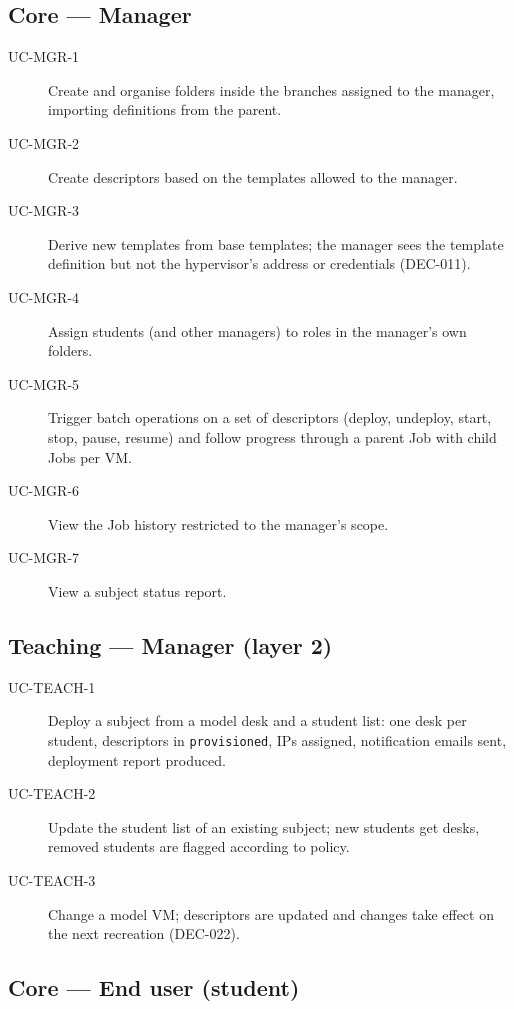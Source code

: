 \subsection{Core --- Manager}

\begin{description}
  \item[UC-MGR-1] Create and organise folders inside the branches
        assigned to the manager, importing definitions from the
        parent.
  \item[UC-MGR-2] Create descriptors based on the templates
        allowed to the manager.
  \item[UC-MGR-3] Derive new templates from base templates; the
        manager sees the template definition but not the
        hypervisor's address or credentials (DEC-011).
  \item[UC-MGR-4] Assign students (and other managers) to roles in
        the manager's own folders.
  \item[UC-MGR-5] Trigger batch operations on a set of descriptors
        (deploy, undeploy, start, stop, pause, resume) and follow
        progress through a parent Job with child Jobs per VM.
  \item[UC-MGR-6] View the Job history restricted to the manager's
        scope.
  \item[UC-MGR-7] View a subject status report.
\end{description}

\subsection{Teaching --- Manager (layer 2)}

\begin{description}
  \item[UC-TEACH-1] Deploy a subject from a model desk and a
        student list: one desk per student, descriptors in
        \texttt{provisioned}, IPs assigned, notification emails
        sent, deployment report produced.
  \item[UC-TEACH-2] Update the student list of an existing subject;
        new students get desks, removed students are flagged
        according to policy.
  \item[UC-TEACH-3] Change a model VM; descriptors are updated and
        changes take effect on the next recreation
        (DEC-022).
\end{description}

\subsection{Core --- End user (student)}

